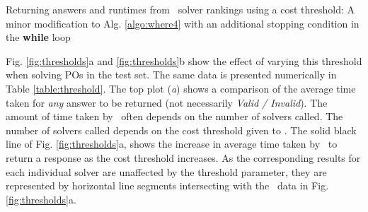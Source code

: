 \begin{algorithm}
	\caption{Returning answers and runtimes from \where~solver rankings using a cost threshold: A minor modification to Alg. \ref{algo:where4} with an additional stopping condition in the \textbf{while} loop}
	\label{algo:threshold}
	
\end{algorithm}



Fig. \ref{fig:thresholds}a and \ref{fig:thresholds}b show the effect of varying this threshold when solving POs in the test set.
The same data is presented numerically in Table \ref{table:threshold}. 
The top plot (\textit{a}) shows a comparison of the average time taken for \textit{any} answer to be returned (not necessarily \textit{Valid / Invalid}).
The amount of time taken by \where~often depends on the number of solvers called.
The number of solvers called depends on the cost threshold given to \where. 
The solid black line of Fig. \ref{fig:thresholds}a, shows the increase in average time taken by \where~to return a response as the cost threshold increases.
As the corresponding results for each individual solver are unaffected by the threshold parameter, they are represented by horizontal line segments intersecting with the \where~data in Fig. \ref{fig:thresholds}a.

